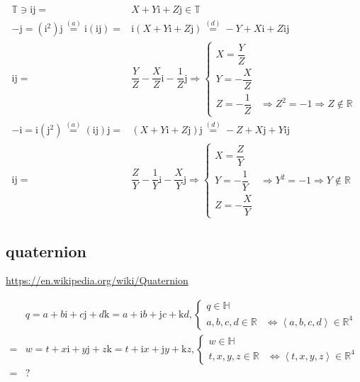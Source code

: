 \documentclass[
]{book}
\theoremstyle{definition}
\theoremstyle{definition}
\theoremstyle{definition}
\theoremstyle{definition}
\theoremstyle{remark}
\begin{document}
\[
\begin{aligned}
\mathbb{T}\ni\mathrm{i}\mathrm{j}= & X+Y\mathrm{i}+Z\mathrm{j}\in\mathbb{T}\\
-\mathrm{j}=\left(\mathrm{i}^{2}\right)\mathrm{j}\overset{\left(a\right)}{=}\mathrm{i}\left(\mathrm{i}\mathrm{j}\right)= & \mathrm{i}\left(X+Y\mathrm{i}+Z\mathrm{j}\right)\overset{\left(d\right)}{=}-Y+X\mathrm{i}+Z\mathrm{i}\mathrm{j}\\
\mathrm{i}\mathrm{j}= & \dfrac{Y}{Z}-\dfrac{X}{Z}\mathrm{i}-\dfrac{1}{Z}\mathrm{j}\Rightarrow\begin{cases}
X=\dfrac{Y}{Z}\\
Y=-\dfrac{X}{Z}\\
Z=-\dfrac{1}{Z} & \Rightarrow Z^{2}=-1\Rightarrow Z\notin\mathbb{R}
\end{cases}\\
-\mathrm{i}=\mathrm{i}\left(\mathrm{j}^{2}\right)\overset{\left(a\right)}{=}\left(\mathrm{i}\mathrm{j}\right)\mathrm{j}= & \left(X+Y\mathrm{i}+Z\mathrm{j}\right)\mathrm{j}\overset{\left(d\right)}{=}-Z+X\mathrm{j}+Y\mathrm{i}\mathrm{j}\\
\mathrm{i}\mathrm{j}= & \dfrac{Z}{Y}-\dfrac{1}{Y}\mathrm{i}-\dfrac{X}{Y}\mathrm{j}\Rightarrow\begin{cases}
X=\dfrac{Z}{Y}\\
Y=-\dfrac{1}{Y} & \Rightarrow Y^{2}=-1\Rightarrow Y\notin\mathbb{R}\\
Z=-\dfrac{X}{Y}
\end{cases}
\end{aligned}
\]

\hypertarget{quaternion-1}{%
\subsection{quaternion}\label{quaternion-1}}

\url{https://en.wikipedia.org/wiki/Quaternion}

\[
\begin{aligned}
 & q=a+b\mathrm{i}+c\mathrm{j}+d\mathrm{k}=a+\mathrm{i}b+\mathrm{j}c+\mathrm{k}d,\begin{cases}
q\in\mathbb{H}\\
a,b,c,d\in\mathbb{R} & \Leftrightarrow\left\langle a,b,c,d\right\rangle \in\mathbb{R}^{4}
\end{cases}\\
= & w=t+x\mathrm{i}+y\mathrm{j}+z\mathrm{k}=t+\mathrm{i}x+\mathrm{j}y+\mathrm{k}z,\begin{cases}
w\in\mathbb{H}\\
t,x,y,z\in\mathbb{R} & \Leftrightarrow\left\langle t,x,y,z\right\rangle \in\mathbb{R}^{4}
\end{cases}\\
= & ?
\end{aligned}
\]
\end{document}
